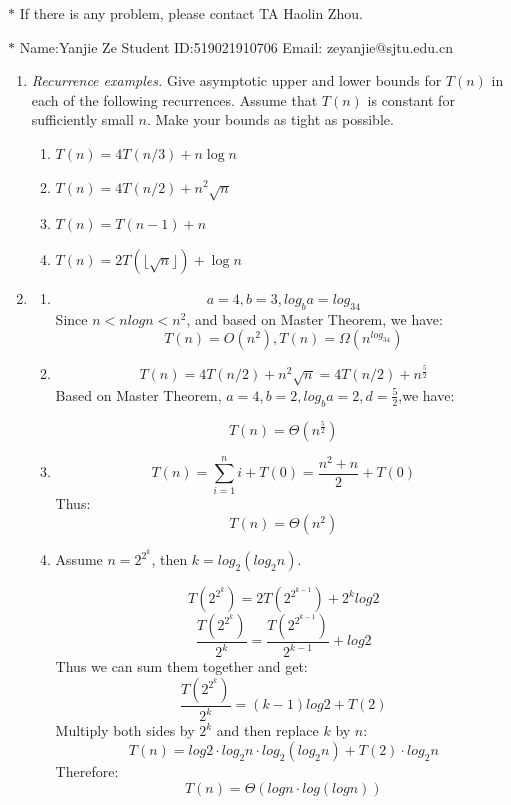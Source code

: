 \documentclass[12pt,a4paper]{article}
\makeatletter
\newtheorem*{solution}{Solution}
\theoremstyle{definition}
\renewenvironment{solution}[1][Solution] {\par\pushQED{\qed}\normalfont\topsep6\p@\@plus6\p@\relax\trivlist\item[\hskip\labelsep\bfseries#1\@addpunct{.}]\ignorespaces}{\popQED\endtrivlist\@endpefalse} \makeatother
\makeatother
\begin{document}
\noindent

\noindent{}
\begin{center}
\footnotesize{\color{red}$*$ If there is any problem, please contact TA Haolin Zhou. }

\footnotesize{\color{blue}$*$ Name:Yanjie Ze  \quad Student ID:519021910706 \quad Email: zeyanjie@sjtu.edu.cn}
\end{center}

\begin{enumerate}
\item
    \textit{Recurrence examples.} Give asymptotic upper and lower bounds for $T(n)$ in each of the following recurrences. Assume that $T(n)$ is constant for sufficiently small $n$. Make your bounds as tight as possible.
\begin{enumerate}
	\item $T(n)=4 T(n / 3)+n \log n$
	\item $T(n)=4 T(n / 2)+n^{2} \sqrt{n}$
	\item $T(n)=T(n-1)+n$	
	\item $T(n)=2T(\lfloor \sqrt n\rfloor)+\log n$
\end{enumerate}
\begin{solution}
\begin{enumerate}
\item 
$$
a=4, b=3, log_ba=log_34
$$
Since $n<nlogn<n^2$, and based on Master Theorem, we have:
$$
T(n)=O(n^2), T(n)=\Omega(n^{log_34})
$$

\item
 $$
 T(n)=4 T(n / 2)+n^{2} \sqrt{n}=4 T(n / 2)+n^{\frac{5}{2}} 
 $$
 Based on Master Theorem, $a=4, b=2, log_ba=2, d=\frac{5}{2}$,we have:
 
 $$
 T(n) = \Theta(n^\frac{5}{2})
 $$
 
 \item
 $$
 \displaystyle T(n)=\sum_{i=1}^ni+T(0) = \frac{n^2+n}{2}+T(0)
 $$
 Thus:
 $$
 T(n)=\Theta(n^2)
 $$
 
 \item
Assume $n=2^{2^k}$, then $k=log_2(log_2n)$. 

$$
T(2^{2^k}) = 2T(2^{2^{k-1}})+2^klog2
$$
$$
\frac{T(2^{2^k})}{2^k} = \frac{T(2^{2^{k-1}})}{2^{k-1}}+log2
$$
Thus we can sum them together and get:
$$
 \frac{T(2^{2^k})}{2^k} = (k-1)log2 + T(2)
$$
Multiply both sides by $2^k$ and then replace $k$ by $n$:
$$
T(n) = log2\cdot log_2n\cdot log_2(log_2n)+ T(2)\cdot log_2n
$$
Therefore:
$$
T(n) = \Theta(logn\cdot log(logn))
$$


\end{enumerate}
\end{solution}
\end{enumerate}
\end{document}
